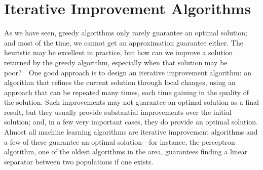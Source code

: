 \documentclass[11pt]{article}
\begin{document}
\section{Iterative Improvement Algorithms}
As we have seen, greedy algorithms only rarely guarantee an optimal solution;
and most of the time, we cannot get an approximation guarantee either.
The heuristic may be excellent in practice, but how can we improve a solution
returned by the greedy algorithm, especially when that solution may be poor?\ \ 
One good approach is to design an iterative improvement algorithm: an algorithm
that refines the current solution through local changes, using an approach
that can be repeated many times, each time gaining in the quality of the
solution.   Such improvements may not guarantee an optimal solution as a final
result, but they usually provide substantial improvements over the initial
solution; and, in a few very important cases, they do provide an optimal
solution.  Almost all machine learning algorithms are iterative improvement
algorithms and a few of these guarantee an optimal solution---for instance,
the perceptron algorithm, one of the oldest algorithms in the area, guarantees
finding a linear separator between two populations if one exists.
\end{document}

